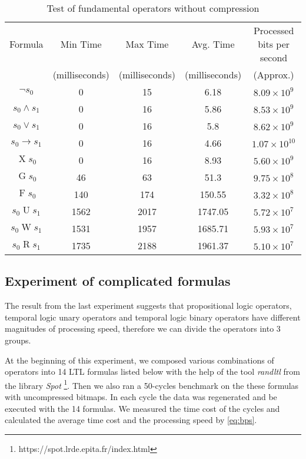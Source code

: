 \begin{table}[h]
\centering
\begin{tabular}{|c|c|c|c|c|}
\hline
Formula & Min Time & Max Time & Avg. Time & Processed bits per second \\
& (milliseconds) & (milliseconds) & (milliseconds) & (Approx.) \\
\hline
$\neg s_0$ & 0 & 15 & 6.18 & $8.09 \times 10^{9}$ \\
\hline
$s_0 \wedge s_1$ & 0 & 16 & 5.86 & $8.53 \times 10^{9}$ \\
\hline
$s_0 \vee s_1$ & 0 & 16 & 5.8 & $8.62 \times 10^{9}$ \\
\hline
$s_0 \rightarrow s_1$ & 0 & 16 & 4.66 & $1.07 \times 10^{10}$ \\
\hline
$\mathop{X}s_0$ & 0 & 16 & 8.93 & $5.60 \times 10^{9}$ \\
\hline
$\mathop{G}s_0$ & 46 & 63 & 51.3 & $9.75 \times 10^8$ \\
\hline
$\mathop{F}s_0$ & 140 & 174 & 150.55 & $3.32 \times 10^8$ \\
\hline
$s_0 \mathrel{U} s_1$ & 1562 & 2017 & 1747.05 & $5.72 \times 10^7$ \\
\hline
$s_0 \mathrel{W} s_1$ & 1531 & 1957 & 1685.71 & $5.93 \times 10^7$ \\
\hline
$s_0 \mathrel{R} s_1$ & 1735 & 2188 & 1961.37 & $5.10 \times 10^7$ \\
\hline
\end{tabular}
\caption{Test of fundamental operators without compression}
\label{tbl:basicops}
\end{table}


\subsection{Experiment of complicated formulas} %

The result from the last experiment suggests that propositional logic operators, temporal logic unary operators and temporal logic binary operators have different magnitudes of processing speed, therefore we can divide the operators into 3 groups.

At the beginning of this experiment, we composed various combinations of operators into 14 LTL formulas listed below with the help of the tool \emph{randltl} from the library \emph{Spot} \footnote{https://spot.lrde.epita.fr/index.html}. Then we also ran a 50-cycles benchmark on the these formulas with uncompressed bitmaps. In each cycle the data was regenerated and be executed with the 14 formulas. We measured the time cost of the cycles and calculated the average time cost and the processing speed by \eqref{eq:bps}.

